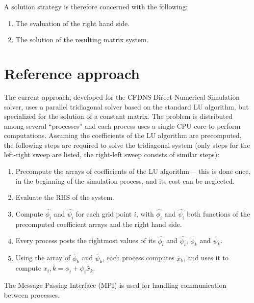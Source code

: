 \documentclass{article}
\begin{document}
    A solution strategy is therefore concerned with the following:

    \begin{enumerate}
        \item{The evaluation of the right hand side.}
        \item{The solution of the resulting matrix system.}
    \end{enumerate}

\section{Reference approach} \label{sec:ref-approach}
    The current approach, developed for the CFDNS \cite{livescu2009cfdns}
    Direct Numerical Simulation solver,
    uses a parallel tridiagonal solver based on the standard LU algorithm,
    but specialized for the solution of a constant matrix.
    The problem is distributed among several ``processes'' and each
    process uses a single CPU core to perform computations.
    Assuming the coefficients of the LU algorithm are precomputed,
    the following steps are required to solve the tridiagonal system
    (only steps for the left-right sweep are listed, the right-left sweep
    consists of similar steps):

    \begin{enumerate}
    \item Precompute the arrays of coefficients of the LU algorithm---
    this is done once, in the beginning of the simulation process, and its cost
    can be neglected.
    \item Evaluate the RHS of the system.
    \item Compute $\hat{\phi_i}$ and $\hat{\psi_i}$ for each grid point $i$,
    with $\hat{\phi_i}$ and $\hat{\psi_i}$ both functions of the precomputed
    coefficient arrays and the right hand side.
    \item Every process posts the rightmost values of its $\hat{\phi_i}$ and $\hat{\psi_i}$,
        $\widetilde{\phi_k}$ and $\widetilde{\psi_k}$.
    \item Using the array of $\widetilde{\phi_k}$ and $\widetilde{\psi_k}$,
        each process computes $\widetilde{x_k}$, and uses it to compute
        $x_i,k = \phi_i + \psi_i\widetilde{x_k}$.
    \end{enumerate}

    The Message Passing Interface (MPI) is used for handling communication
    between processes.
\end{document}

